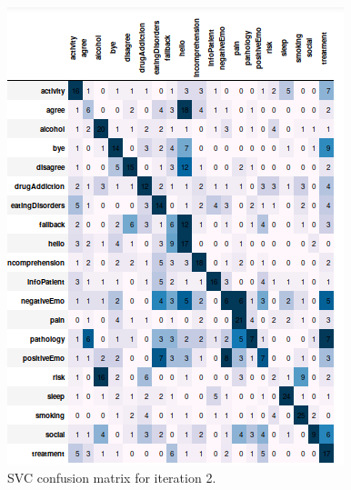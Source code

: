 \documentclass[11pt]{article}
\begin{document}
\begin{figure}[h]
	\centering
	\includegraphics[scale=0.7]{svc2_cm.png}
	\caption{SVC confusion matrix for iteration 2.}
\label{svc_cm_2}
\end{figure}
\FloatBarrier
\end{document}
